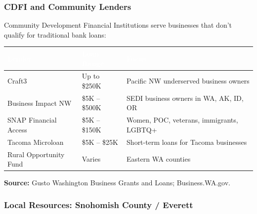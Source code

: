 \documentclass[11pt,letterpaper]{article}
\newcommand{\tableheader}[1]{\textbf{\sffamily\textcolor{white}{#1}}}
\begin{document}
\subsubsection{CDFI and Community Lenders}

Community Development Financial Institutions serve businesses that don't qualify for traditional bank loans:

\begin{center}
\begin{tabularx}{\textwidth}{L{3.5cm}L{3cm}X}
\toprule
{}
\tableheader{Lender} & \tableheader{Loan Range} & \tableheader{Focus} \\
\midrule
Craft3 & Up to \$250K & Pacific NW underserved business owners \\
Business Impact NW & \$5K -- \$500K & SEDI business owners in WA, AK, ID, OR \\
SNAP Financial Access & \$5K -- \$150K & Women, POC, veterans, immigrants, LGBTQ+ \\
Tacoma Microloan & \$5K -- \$25K & Short-term loans for Tacoma businesses \\
Rural Opportunity Fund & Varies & Eastern WA counties \\
\bottomrule
\end{tabularx}
\end{center}

\textbf{Source:} Gusto Washington Business Grants and Loans; Business.WA.gov.

\subsubsection{Local Resources: Snohomish County / Everett}
\end{document}
